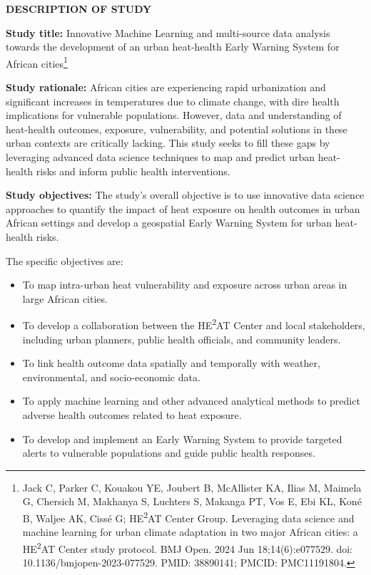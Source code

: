 \documentclass[12pt,letterpaper]{article}
\begin{document}
\textbf{DESCRIPTION OF STUDY}

\textbf{Study title:} Innovative Machine Learning and multi-source data analysis towards the development of an urban heat-health Early Warning System for African cities\footnote{Jack C, Parker C, Kouakou YE, Joubert B, McAllister KA, Ilias M, Maimela G, Chersich M, Makhanya S, Luchters S, Makanga PT, Vos E, Ebi KL, Koné B, Waljee AK, Cissé G; HE\textsuperscript{2}AT Center Group. Leveraging data science and machine learning for urban climate adaptation in two major African cities: a HE\textsuperscript{2}AT Center study protocol. BMJ Open. 2024 Jun 18;14(6):e077529. doi: 10.1136/bmjopen-2023-077529. PMID: 38890141; PMCID: PMC11191804.}

\textbf{Study rationale:} African cities are experiencing rapid urbanization and significant increases in temperatures due to climate change, with dire health implications for vulnerable populations. However, data and understanding of heat-health outcomes, exposure, vulnerability, and potential solutions in these urban contexts are critically lacking. This study seeks to fill these gaps by leveraging advanced data science techniques to map and predict urban heat-health risks and inform public health interventions.

\textbf{Study objectives:} The study's overall objective is to use innovative data science approaches to quantify the impact of heat exposure on health outcomes in urban African settings and develop a geospatial Early Warning System for urban heat-health risks.

The specific objectives are:
\begin{itemize}
    \item To map intra-urban heat vulnerability and exposure across urban areas in large African cities.
    \item To develop a collaboration between the HE\textsuperscript{2}AT Center and local stakeholders, including urban planners, public health officials, and community leaders.
    \item To link health outcome data spatially and temporally with weather, environmental, and socio-economic data.
    \item To apply machine learning and other advanced analytical methods to predict adverse health outcomes related to heat exposure.
    \item To develop and implement an Early Warning System to provide targeted alerts to vulnerable populations and guide public health responses.
\end{itemize}
\end{document}
